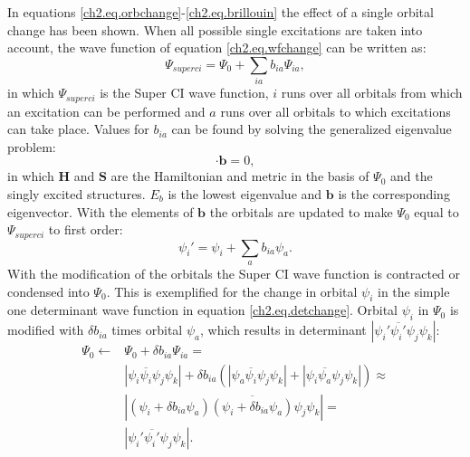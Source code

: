 In equations \ref{ch2.eq.orbchange}-\ref{ch2.eq.brillouin} the effect of a single orbital change has been shown. When all possible single excitations are taken into account, the wave function of equation \ref{ch2.eq.wfchange} can be written as:
\begin{equation}
\Psi_{superci} = \Psi_0 + \sum_{ia} b_{ia} \Psi_{ia},
\label{ch2.eq.superci}
\end{equation}
in which $\Psi_{superci}$ is the Super CI wave function, $i$ runs over all orbitals from which an excitation can be performed and $a$ runs over all orbitals to which excitations can take place. Values for $b_{ia}$ can be found by solving the generalized eigenvalue problem:
\begin{equation}
[\mathbf{H}-E_b\mathbf{S}] \cdot \mathbf{b} = 0,
\label{ch2.eq.geig}
\end{equation}
in which $\mathbf{H}$ and $\mathbf{S}$ are the Hamiltonian and metric in the basis of $\Psi_0$ and the singly excited structures. $E_b$ is the lowest eigenvalue and $\mathbf{b}$ is the corresponding eigenvector. With the elements of $\mathbf{b}$ the orbitals are updated to make $\Psi_0$ equal to $\Psi_{superci}$ to first order:
\begin{equation}
\psi_i' = \psi_i + \sum_{a} b_{ia} \psi_a.
\label{ch2.eq.orbupd}
\end{equation}
With the modification of the orbitals the Super CI wave function is contracted or condensed into $\Psi_0$. This is exemplified for the change in orbital $\psi_i$ in the simple one determinant wave function in equation \ref{ch2.eq.detchange}. Orbital $\psi_i$ in $\Psi_0$ is modified with $\delta b_{ia}$ times orbital $\psi_a$, which results in determinant $|\psi_i'\overline{\psi_i'}\psi_j\psi_k |$:
\begin{equation}
\begin{split}
\Psi_{0} \leftarrow & \Psi_{0} + \delta b_{ia} \Psi_{ia} = \\
&|\psi_i\overline{\psi_i}\psi_j\psi_k| + \delta b_{ia}(|\psi_a\overline{\psi_i}\psi_j\psi_k| + |\psi_i\overline{\psi_a}\psi_j\psi_k|) \approx \\
&|(\psi_i + \delta b_{ia}\psi_a)\overline{(\psi_i + \delta b_{ia}\psi_a)}\psi_j\psi_k| = \\
&|\psi_i'\overline{\psi_i'}\psi_j\psi_k |.\\
\end{split}
\label{ch2.eq.condense}
\end{equation}
